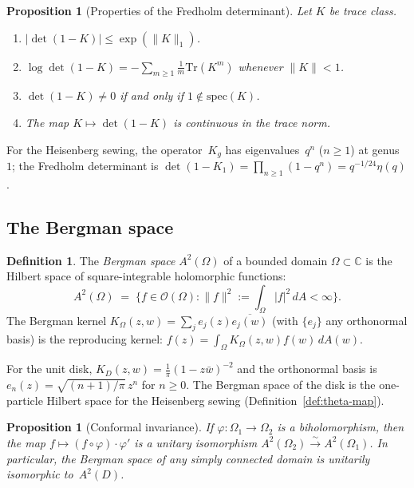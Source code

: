 \documentclass[11pt,reqno]{amsart}
\newtheorem{proposition}[theorem]{Proposition}
\theoremstyle{definition}
\newtheorem{definition}[theorem]{Definition}
\theoremstyle{remark}
\newcommand{\cO}{\mathcal{O}}
\newcommand{\bC}{\mathbb{C}}
\newcommand{\Tr}{\mathrm{Tr}}
\numberwithin{equation}{section}
\begin{document}
\begin{proposition}[Properties of the Fredholm determinant]
\label{prop:fredholm-properties}
Let $K$ be trace class.
\begin{enumerate}[label=\textup{(\roman*)}]
\item $|\det(1 - K)| \leq \exp(\|K\|_1)$.
\item $\log\det(1 - K)
 = -\sum_{m \geq 1}\frac{1}{m}\Tr(K^m)$
 whenever $\|K\| < 1$.
\item $\det(1 - K) \neq 0$ if and only if
 $1 \notin \mathrm{spec}(K)$.
\item The map $K \mapsto \det(1 - K)$ is continuous in the
 trace norm.
\end{enumerate}
\end{proposition}

For the Heisenberg sewing, the operator~$K_g$ has
eigenvalues~$q^n$ ($n \geq 1$) at genus~$1$; the Fredholm
determinant is $\det(1 - K_1) = \prod_{n \geq 1}(1-q^n)
= q^{-1/24}\eta(q)$.

\subsection{The Bergman space}\label{app:bergman}

\begin{definition}\label{def:bergman-space}
The \emph{Bergman space} $A^2(\Omega)$ of a bounded domain
$\Omega \subset \bC$ is the Hilbert space of
square-integrable holomorphic functions:
\[
A^2(\Omega)
\;=\;
\bigl\{f \in \cO(\Omega) :
\|f\|^2 := \textstyle\int_\Omega |f|^2\,dA < \infty
\bigr\}.
\]
The Bergman kernel
$K_\Omega(z,w) = \sum_j e_j(z)\overline{e_j(w)}$
(with $\{e_j\}$ any orthonormal basis) is the reproducing
kernel: $f(z) = \int_\Omega K_\Omega(z,w) f(w)\,dA(w)$.
\end{definition}

For the unit disk,
$K_D(z,w) = \frac{1}{\pi}(1-z\bar w)^{-2}$
and the orthonormal basis is
$e_n(z) = \sqrt{(n+1)/\pi}\,z^n$
for $n \geq 0$.  The Bergman space of the disk is the
one-particle Hilbert space for the Heisenberg sewing
(Definition~\ref{def:theta-map}).

\begin{proposition}[Conformal invariance]
\label{prop:bergman-conformal}
If $\varphi \colon \Omega_1 \to \Omega_2$ is a biholomorphism,
then the map $f \mapsto (f \circ \varphi)\cdot\varphi'$ is a
unitary isomorphism
$A^2(\Omega_2) \xrightarrow{\sim} A^2(\Omega_1)$.  In
particular, the Bergman space of any simply connected domain is
unitarily isomorphic to~$A^2(D)$.
\end{proposition}
\end{document}

